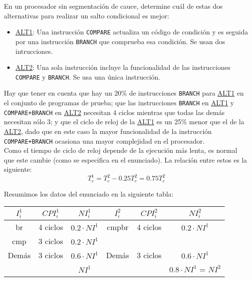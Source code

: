 \begin{ejercicio} \label{ej:1.3}
    En un procesador sin segmentación de cauce, determine cuál de estas dos alternativas para
    realizar un salto condicional es mejor:
    \begin{itemize}
        \item \ul{ALT1}: Una instrucción \verb|COMPARE| actualiza un código de condición y es seguida por una instrucción \verb|BRANCH| que comprueba esa condición. Se usan dos intrucciones.
        \item \ul{ALT2}: Una sola instrucción incluye la funcionalidad de las instrucciones \verb|COMPARE| y \verb|BRANCH|. Se usa una única instrucción.
    \end{itemize}

    Hay que tener en cuenta que hay un 20\% de instrucciones \verb|BRANCH| para \ul{ALT1}
    en el conjunto de programas de prueba; que las instrucciones \verb|BRANCH| en \ul{ALT1} y
    \verb|COMPARE+BRANCH| en \ul{ALT2} necesitan 4 ciclos mientras que todas las demás necesitan sólo 3;
    y que el ciclo de reloj de la \ul{ALT1} es un 25\% menor que el de la \ul{ALT2}, dado que en este caso
    la mayor funcionalidad de la instrucción \verb|COMPARE+BRANCH| ocasiona una mayor complejidad en el procesador.\\

    Como el tiempo de ciclo de reloj depende de la ejecución más lenta, es normal que este cambie (como se especifica en el enunciado). La relación entre estos es la siguiente:
    \begin{equation*}
        T_c^1 = T_c^2 - 0.25 T_c^2 = 0.75 T_c^2
    \end{equation*}

    Resumimos los datos del enunciado en la siguiente tabla:
    \begin{table}[H]
        \centering
        \begin{tabular}{c|c|c|c|c|c}
            $I_i^1$ & $CPI_i^1$ & $NI_i^1$ & $I_i^2$ & $CPI_i^2$ & $NI_i^2$ \\
            \hline
            br & 4 ciclos & $0.2 \cdot NI^1$ & cmpbr & 4 ciclos & $0.2 \cdot NI^1$ \\
            cmp & 3 ciclos & $0.2 \cdot NI^1$ &  &  &  \\
            Demás & 3 ciclos & $0.6 \cdot NI^1$ & Demás & 3 ciclos & $0.6 \cdot NI^1$ \\
            \hline
            & & $NI^1$ &  &  & $0.8 \cdot NI^1$ = $NI^2$ \\
        \end{tabular}
    \end{table}


\end{ejercicio}
